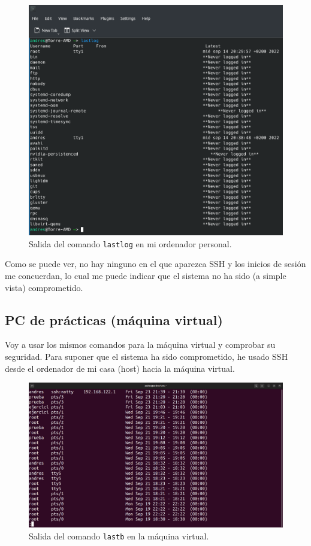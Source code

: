 \documentclass{article}
\begin{document}
\begin{figure}[H]
    \includegraphics[width=\textwidth]{imagenes/lastlogcasa.png}
    \caption{Salida del comando \texttt{lastlog} en mi ordenador personal.}
\end{figure}

Como se puede ver, no hay ninguno en el que aparezca SSH y los inicios de sesión me concuerdan, lo cual me puede indicar que el sistema no ha sido (a simple vista) comprometido.

\newpage

\subsection{PC de prácticas (máquina virtual)}
Voy a usar los mismos comandos para la máquina virtual y comprobar su seguridad. Para suponer que el sistema ha sido comprometido, he usado SSH desde el ordenador de mi casa (host) hacia la máquina virtual.

\begin{figure}[H]
    \includegraphics[width=\textwidth]{imagenes/lastbip.png}
    \caption{Salida del comando \texttt{lastb} en la máquina virtual.}
\end{figure}
\end{document}
